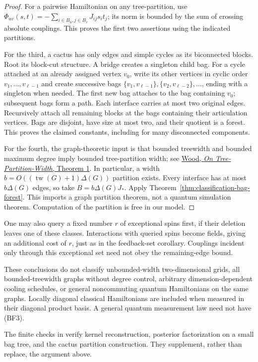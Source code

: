 \begin{proof}
For a pairwise Hamiltonian on any tree-partition, use
$\Phi_{uv}(s,t)=-\sum_{i\in B_u,j\in B_v}J_{ij}s_it_j$;
its norm is bounded by the sum of crossing absolute couplings.
This proves the first two assertions using the indicated partitions.

For the third, a cactus has only edges and simple cycles as its
biconnected blocks. Root its block-cut structure. A bridge creates
a singleton child bag. For a cycle attached at an already assigned
vertex $v_0$, write its other vertices in cyclic order
$v_1,\ldots,v_{\ell-1}$ and create successive bags
$\{v_1,v_{\ell-1}\},\{v_2,v_{\ell-2}\},\ldots$, ending with
a singleton when needed. The first new bag attaches to the bag
containing $v_0$; subsequent bags form a path. Each interface carries
at most two original edges. Recursively attach all remaining blocks
at the bags containing their articulation vertices. Bags are disjoint,
have size at most two, and their quotient is a forest. This proves
the claimed constants, including for many disconnected components.

For the fourth, the graph-theoretic input is that bounded treewidth
and bounded maximum degree imply bounded tree-partition width;
see \href{https://arxiv.org/abs/math/0602507}{Wood, \emph{On
Tree-Partition-Width}, Theorem 1}. In particular, a width
$b=O((\operatorname{tw}(G)+1)\Delta(G))$ partition exists. Every
interface has at most $b\Delta(G)$ edges, so take
$B=b\Delta(G)J_*$. Apply Theorem~\ref{thm:classification-bag-forest}.
This imports a graph partition theorem, not a quantum simulation
theorem. Computation of the partition is free in our model.
\end{proof}

One may also query a fixed number $r$ of exceptional spins first,
if their deletion leaves one of these classes. Interactions with
queried spins become fields, giving an additional cost of $r$,
just as in the feedback-set corollary. Couplings incident only
through this exceptional set need not obey the remaining-edge bound.

These conclusions do not classify unbounded-width two-dimensional
grids, all bounded-treewidth graphs without degree control, arbitrary
dimension-dependent cooling schedules, or general noncommuting
quantum Hamiltonians on the same graphs. Locally diagonal classical
Hamiltonians are included when measured in their diagonal product
basis. A general quantum measurement law need not have (BF3).

The finite checks in 
verify kernel reconstruction, posterior factorization on a small
bag tree, and the cactus partition construction. They supplement,
rather than replace, the argument above.
